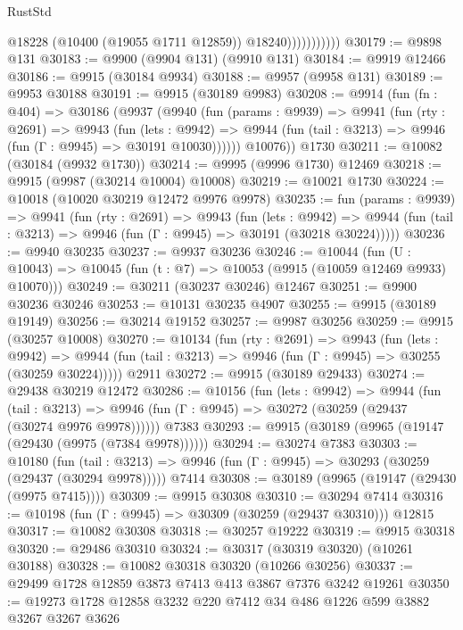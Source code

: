 \begin{lexlean}{RustStd}
\begin{coremodule}
                          @18228
                          (@10400 (@19055 @1711 @12859))
                          @18240)))))))))))
@30179 := @9898 @131
@30183 := @9900 (@9904 @131) (@9910 @131)
@30184 := @9919 @12466
@30186 := @9915 (@30184 @9934)
@30188 := @9957 (@9958 @131)
@30189 := @9953 @30188
@30191 := @9915 (@30189 @9983)
@30208 := @9914
    (fun (fn : @404) =>
    @30186
      (@9937
        (@9940
          (fun (params : @9939) =>
          @9941
            (fun (rty : @2691) =>
            @9943
              (fun (lets : @9942) =>
              @9944 (fun (tail : @3213) => @9946 (fun (Γ : @9945) => @30191 @10030))))))
        @10076))
    @1730
@30211 := @10082 (@30184 (@9932 @1730))
@30214 := @9995 (@9996 @1730) @12469
@30218 := @9915 (@9987 (@30214 @10004) @10008)
@30219 := @10021 @1730
@30224 := @10018 (@10020 @30219 @12472 @9976 @9978)
@30235 := fun (params : @9939) =>
  @9941
    (fun (rty : @2691) =>
    @9943
      (fun (lets : @9942) =>
      @9944 (fun (tail : @3213) => @9946 (fun (Γ : @9945) => @30191 (@30218 @30224)))))
@30236 := @9940 @30235
@30237 := @9937 @30236
@30246 := @10044
    (fun (U : @10043) => @10045 (fun (t : @7) => @10053 (@9915 (@10059 @12469 @9933) @10070)))
@30249 := @30211 (@30237 @30246) @12467
@30251 := @9900 @30236 @30246
@30253 := @10131 @30235 @4907
@30255 := @9915 (@30189 @19149)
@30256 := @30214 @19152
@30257 := @9987 @30256
@30259 := @9915 (@30257 @10008)
@30270 := @10134
    (fun (rty : @2691) =>
    @9943
      (fun (lets : @9942) =>
      @9944 (fun (tail : @3213) => @9946 (fun (Γ : @9945) => @30255 (@30259 @30224)))))
    @2911
@30272 := @9915 (@30189 @29433)
@30274 := @29438 @30219 @12472
@30286 := @10156
    (fun (lets : @9942) =>
    @9944
      (fun (tail : @3213) =>
      @9946 (fun (Γ : @9945) => @30272 (@30259 (@29437 (@30274 @9976 @9978))))))
    @7383
@30293 := @9915 (@30189 (@9965 (@19147 (@29430 (@9975 (@7384 @9978))))))
@30294 := @30274 @7383
@30303 := @10180
    (fun (tail : @3213) => @9946 (fun (Γ : @9945) => @30293 (@30259 (@29437 (@30294 @9978)))))
    @7414
@30308 := @30189 (@9965 (@19147 (@29430 (@9975 @7415))))
@30309 := @9915 @30308
@30310 := @30294 @7414
@30316 := @10198 (fun (Γ : @9945) => @30309 (@30259 (@29437 @30310))) @12815
@30317 := @10082 @30308
@30318 := @30257 @19222
@30319 := @9915 @30318
@30320 := @29486 @30310
@30324 := @30317 (@30319 @30320) (@10261 @30188)
@30328 := @10082 @30318 @30320 (@10266 @30256)
@30337 := @29499 @1728 @12859 @3873 @7413 @413 @3867 @7376 @3242 @19261
@30350 := @19273 @1728 @12858 @3232 @220 @7412 @34 @486 @1226 @599 @3882 @3267 @3267 @3626

\end{coremodule}
\end{lexlean}

